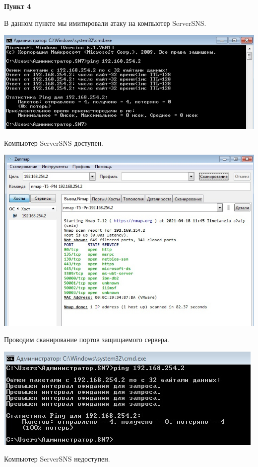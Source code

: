 \documentclass[a4paper,14pt]{extarticle}
\begin{document}
    \textbf{Пункт 4}
    \vspace{-3ex}
    \begin{center}
        \singlespacing
        В данном пункте мы имитировали атаку на компьютер ServerSNS.

        \includegraphics[scale=0.6]{pics/4_1.jpg}
        
        Компьютер ServerSNS доступен.

        \includegraphics[scale=0.6]{pics/4_2.jpg}

        Проводим сканирование портов защищаемого сервера.

        \includegraphics[scale=0.7]{pics/4_3.jpg}

        Компьютер ServerSNS недоступен.

    \end{center}
\end{document}
